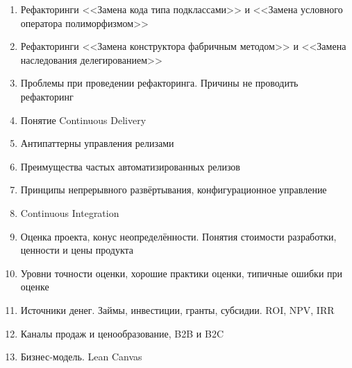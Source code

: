 \documentclass[a5paper]{article}
\begin{document}
\begin{enumerate}
    \item Рефакторинги <<Замена кода типа подклассами>> и <<Замена условного оператора полиморфизмом>>
    \item Рефакторинги <<Замена конструктора фабричным методом>> и <<Замена наследования делегированием>>
    \item Проблемы при проведении рефакторинга. Причины не проводить рефакторинг
    \item Понятие Continuous Delivery
    \item Антипаттерны управления релизами
    \item Преимущества частых автоматизированных релизов
    \item Принципы непрерывного развёртывания, конфигурационное управление
    \item Continuous Integration
    \item Оценка проекта, конус неопределённости. Понятия стоимости разработки, ценности и цены продукта
    \item Уровни точности оценки, хорошие практики оценки, типичные ошибки при оценке
    \item Источники денег. Займы, инвестиции, гранты, субсидии. ROI, NPV, IRR
    \item Каналы продаж и ценообразование, B2B и B2C
    \item Бизнес-модель. Lean Canvas
\end{enumerate}
\end{document}
